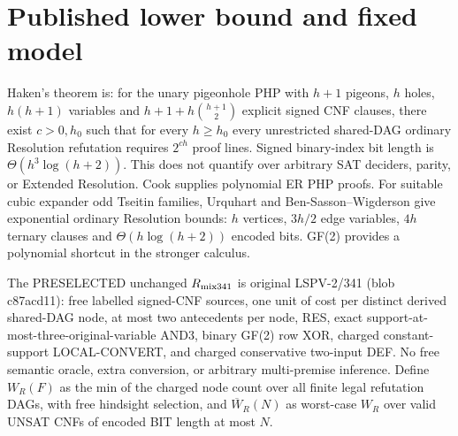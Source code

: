 \documentclass[11pt]{article}
\begin{document}
\section*{Published lower bound and fixed model}
Haken's theorem is: for the unary pigeonhole PHP with $h+1$ pigeons, $h$ holes, $h(h+1)$ variables and $h+1+h\binom{h+1}{2}$ explicit signed CNF clauses, there exist $c>0,h_0$ such that for every $h\ge h_0$ every unrestricted shared-DAG ordinary Resolution refutation requires $2^{ch}$ proof lines. Signed binary-index bit length is $\Theta(h^3\log(h+2))$. This does not quantify over arbitrary SAT deciders, parity, or Extended Resolution. Cook supplies polynomial ER PHP proofs. For suitable cubic expander odd Tseitin families, Urquhart and Ben-Sasson--Wigderson give exponential ordinary Resolution bounds: $h$ vertices, $3h/2$ edge variables, $4h$ ternary clauses and $\Theta(h\log(h+2))$ encoded bits. GF(2) provides a polynomial shortcut in the stronger calculus.
\par The PRESELECTED unchanged $R_{\rm mix341}$ is original LSPV-2/341 (blob c87acd11): free labelled signed-CNF sources, one unit of cost per distinct derived shared-DAG node, at most two antecedents per node, RES, exact support-at-most-three-original-variable AND3, binary GF(2) row XOR, charged constant-support LOCAL-CONVERT, and charged conservative two-input DEF. No free semantic oracle, extra conversion, or arbitrary multi-premise inference. Define $W_R(F)$ as the min of the charged node count over all finite legal refutation DAGs, with free hindsight selection, and $\overline W_R(N)$ as worst-case $W_R$ over valid UNSAT CNFs of encoded BIT length at most $N$.
\end{document}
